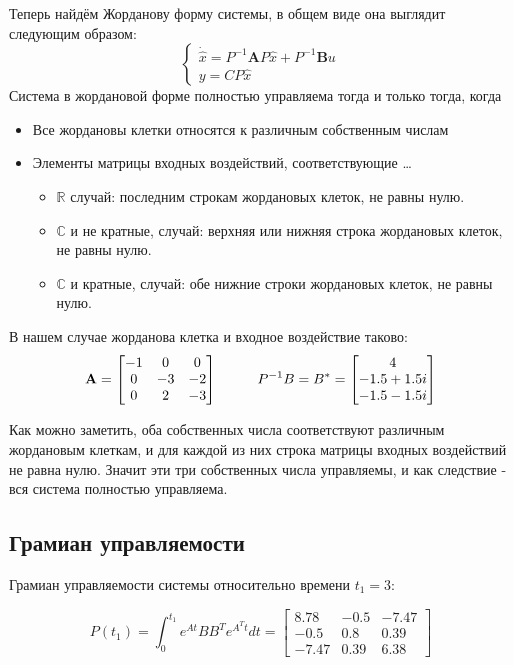 Теперь найдём Жорданову форму системы, в общем виде она выглядит следующим образом:
$$
    \begin{cases}
      \dot{\hat{x}} = P^{-1}\boldsymbol{A}P \hat{x} + P^{-1}\boldsymbol{B} u \\
      y = CP\hat{x}
    \end{cases}
$$
Система в жордановой форме полностью управляема тогда и только тогда, когда
\begin{itemize}
  \item Все жордановы клетки относятся к различным собственным числам
  \item Элементы матрицы входных воздействий, соответствующие \dots
  \begin{itemize}
    \item $\mathbb{R}$ случай: последним строкам жордановых клеток, не равны нулю.
    \item $\mathbb{C}$ и не кратные, случай: верхняя или нижняя строка жордановых клеток, не равны нулю.
    \item $\mathbb{C}$ и кратные, случай: обе нижние строки жордановых клеток, не равны нулю.
  \end{itemize}
\end{itemize}

В нашем случае жорданова клетка и входное воздействие таково:
$$
    \mathbf{A} = \begin{bmatrix}
        -1 & 0 & 0 \\
        0 & -3 & -2 \\
        0 & 2 & -3 
        \end{bmatrix} \hspace*{1cm} 
    P^{-1}B = B^* = \begin{bmatrix}
        4 \\ -1.5+1.5i \\ -1.5-1.5i
        \end{bmatrix}
$$

Как можно заметить, оба собственных числа соответствуют различным жордановым клеткам, и для каждой из них строка матрицы входных воздействий не равна нулю.
Значит эти три собственных числа управляемы, и как следствие - вся система полностью управляема. 

\subsection{Грамиан управляемости}

Грамиан управляемости системы относительно времени $t_1 = 3$:

$$
P(t_1) = \int_{0}^{t_1}e^{At}BB^Te^{A^Tt}dt = 
    \begin{bmatrix}
      8.78 & -0.5 & -7.47 \\ 
      -0.5 & 0.8 & 0.39 \\ 
      -7.47 & 0.39 & 6.38  
    \end{bmatrix}
$$

